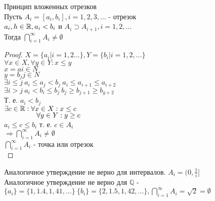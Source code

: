 
\begin{theorem} Принцип вложенных отрезков\\

Пусть $A_i = [a_i, b_i], i = 1,2,3,\dots$ - отрезок \\
$ a_i, h \in \mathbb{R}, a_i < b_i $ и $ A_i \supset A_{i+1} , i=1,2,\dots $ \\
Тогда $ \bigcap_{i=1}^{\infty} A_i \neq \emptyset $\\
\begin{proof} $ X = \{ a_i | i=1,2... \}, Y=\{b_i | i = 1,2,...\} $ \\
$ \forall x \in X, \forall y \in Y: x \leq y $ \\
$ x = a i \in N $\\
$ y = b_j j \in N$ \\
$ \exists i \leq j \ a_i \leq a_j < b_j \ a_i \leq a_{i+1} \leq a_{i+2} $ \\
$ \exists i > j \ a_i < b_i \leq b_j \ b_j \geq b_{j+1} \geq b_{g+2} $\\
Т. е. $ a_i < b_j $ \\
$ \exists c \in \mathbb{R} : \forall x \in X : x \leq c $ \\
$ \hspace*{16mm} \forall y \in Y : y \geq c $ \\
$ a_i \leq c \leq b_i $ т. е. $c \in A_i$ \\ 
$\Rightarrow \bigcap_{i=1}^{\infty} A_i \neq \emptyset$ \\
$ \bigcap_{i=1}^{\infty} A_i $ - точка или отрезок \\
\end{proof}
Аналогичное утверждение не верно для интервалов. $ A_i = (0, \frac{1}{i} ]$ \\
Аналогичное утверждение не верно для $\mathbb{Q}$ - $ \{a_i\} = \{1, 1.4, 1,41, ...\}   \ \{b_i\} = \{2, 1.5, 1,42, ...\},   \bigcap_{i=1}^{\infty} A_i = \sqrt{2} = \emptyset$
\end{theorem}


